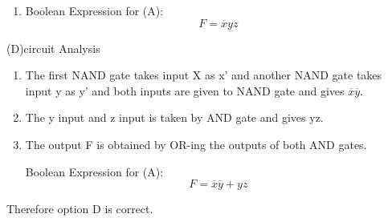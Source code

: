 \documentclass[12pt]{article}
\begin{document}
\begin{enumerate}
\begin{enumerate}
\item Boolean Expression for (A):\\
\[
F = \overline{x}yz
\]
\end{enumerate}
(D)circuit Analysis\\
\begin{enumerate}
\item The first NAND gate takes input X as x' and another NAND gate takes input y as y'  and both inputs are given to NAND gate and gives \(\overline{x}\overline{y}.\)

\item The y input and z input is taken by AND gate and gives  yz.

\item The output F is obtained by OR-ing the outputs of both AND gates.

Boolean Expression for (A):\\
\[
F = \overline{x}\overline{y}+yz
\]
\end{enumerate}

Therefore option D is correct.
\end{enumerate}
\end{document}
